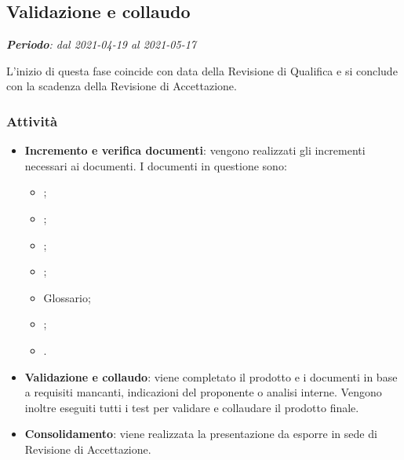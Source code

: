 \subsection{Validazione e collaudo}
\textit{\textbf{Periodo}: dal 2021-04-19 al 2021-05-17}

L'inizio di questa fase coincide con data della Revisione di Qualifica e si conclude con la scadenza della Revisione di Accettazione.

\subsubsection{Attività}

\begin{itemize}
\item \textbf{Incremento e verifica documenti}: vengono realizzati gli incrementi necessari ai documenti. I documenti in questione sono:
\begin{itemize}
\item \NdP{};
\item \AdR{};
\item \PdQ{};
\item \PdP{};
\item Glossario;
\item \MU{};
\item \MM{}.
\end{itemize}
\item \textbf{Validazione e collaudo}: viene completato il prodotto e i documenti in base a requisiti mancanti, indicazioni del proponente o analisi interne. Vengono inoltre eseguiti tutti i test per validare e collaudare il prodotto finale.
\item \textbf{Consolidamento}: viene realizzata la presentazione da esporre in sede di Revisione di Accettazione.
\end{itemize}



